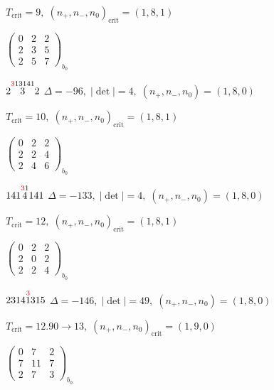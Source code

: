 \documentclass[10pt]{article}
\begin{document}
\hspace{1em}$T_{\text{crit}}=9,\; (n_+,n_-,n_0)_{\text{crit}}=(1,8,1)$

\hspace{2em}$\left(\begin{smallmatrix}0 & 2 & 2 \\ 2 & 3 & 5 \\ 2 & 5 & 7\end{smallmatrix}\right)_{\!b_0}$

\smallskip

$2\overset{\textcolor{red}{3}13141}{3}2$ \quad $\Delta=-96,\; |\det|=4,\; (n_+,n_-,n_0)=(1,8,0)$

\hspace{1em}$T_{\text{crit}}=10,\; (n_+,n_-,n_0)_{\text{crit}}=(1,8,1)$

\hspace{2em}$\left(\begin{smallmatrix}0 & 2 & 2 \\ 2 & 2 & 4 \\ 2 & 4 & 6\end{smallmatrix}\right)_{\!b_0}$

\smallskip

$141\overset{\textcolor{red}{3}1}{4}141$ \quad $\Delta=-133,\; |\det|=4,\; (n_+,n_-,n_0)=(1,8,0)$

\hspace{1em}$T_{\text{crit}}=12,\; (n_+,n_-,n_0)_{\text{crit}}=(1,8,1)$

\hspace{2em}$\left(\begin{smallmatrix}0 & 2 & 2 \\ 2 & 0 & 2 \\ 2 & 2 & 4\end{smallmatrix}\right)_{\!b_0}$

\smallskip

$2314\overset{\textcolor{red}{3}}{1}315$ \quad $\Delta=-146,\; |\det|=49,\; (n_+,n_-,n_0)=(1,8,0)$

\hspace{1em}$T_{\text{crit}}=12.90 \to 13,\; (n_+,n_-,n_0)_{\text{crit}}=(1,9,0)$

\hspace{2em}$\left(\begin{smallmatrix}0 & 7 & 2 \\ 7 & 11 & 7 \\ 2 & 7 & 3\end{smallmatrix}\right)_{\!b_0}$
\end{document}
